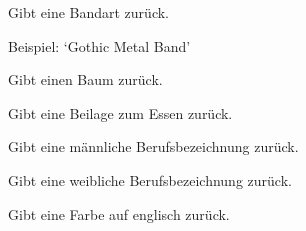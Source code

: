 \documentclass[a4paper,12pt,oneside]{sphinxmanual}
\begin{document}

\begin{fulllineitems}
\label{funktionen:pyzufall.bandart}
Gibt eine Bandart zurück.

Beispiel: `Gothic Metal Band'

\end{fulllineitems}


\begin{fulllineitems}
\label{funktionen:pyzufall.baum}
Gibt einen Baum zurück.

\end{fulllineitems}


\begin{fulllineitems}
\label{funktionen:pyzufall.beilage}
Gibt eine Beilage zum Essen zurück.

\end{fulllineitems}


\begin{fulllineitems}
\label{funktionen:pyzufall.beruf_m}
Gibt eine männliche Berufsbezeichnung zurück.

\end{fulllineitems}


\begin{fulllineitems}
\label{funktionen:pyzufall.beruf_w}
Gibt eine weibliche Berufsbezeichnung zurück.

\end{fulllineitems}


\begin{fulllineitems}
\label{funktionen:pyzufall.color}
Gibt eine Farbe auf englisch zurück.

\end{fulllineitems}
\end{document}

